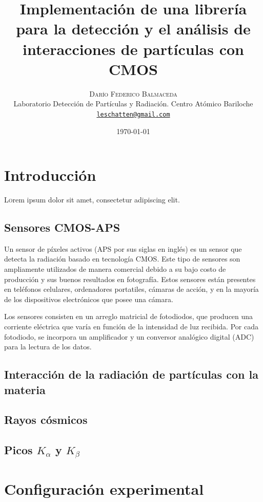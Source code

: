 \documentclass[twoside,twocolumn]{article}
\title{Implementación de una librería para la detección y el análisis de interacciones de partículas con CMOS}
\author{%
    \textsc{Darío Federico Balmaceda} \\[1ex]     %
    \normalsize Laboratorio Detección de Partículas y Radiación. Centro Atómico Bariloche \\                                    %
    \normalsize \href{mailto:leschatten@gmail.com}{\texttt{leschatten@gmail.com}}                   %
  }
\date{\today}                                                                %
\begin{document}
  
  \maketitle              %
  
  \section{Introducción}
  \lettrine[nindent=0em,lines=3]{L} orem ipsum dolor sit amet, consectetur adipiscing elit.
  \subsection{Sensores CMOS-APS}
  Un sensor de píxeles activos (APS por sus siglas en inglés) es un sensor que detecta la radiación basado en tecnología CMOS.
  Este tipo de sensores son ampliamente utilizados de manera comercial debido a su
  bajo costo de producción y sus buenos resultados en fotografía.
  Estos sensores están presentes en teléfonos celulares, ordenadores portatiles, cámaras de acción,
  y en la mayoría de los dispositivos electrónicos que posee una cámara.

  Los sensores consisten en un arreglo matricial de fotodiodos, 
  que producen una corriente eléctrica que varía en función de la intensidad de luz recibida.
  Por cada fotodiodo, se incorpora un amplificador y un conversor analógico digital (ADC) para la lectura de los datos.
  

  \subsection{Interacción de la radiación de partículas con la materia}

  \subsection{Rayos cósmicos}
    
  \subsection{Picos $K_{\alpha}$ y $K_{\beta}$}


  \section{Configuración experimental}
\end{document}
